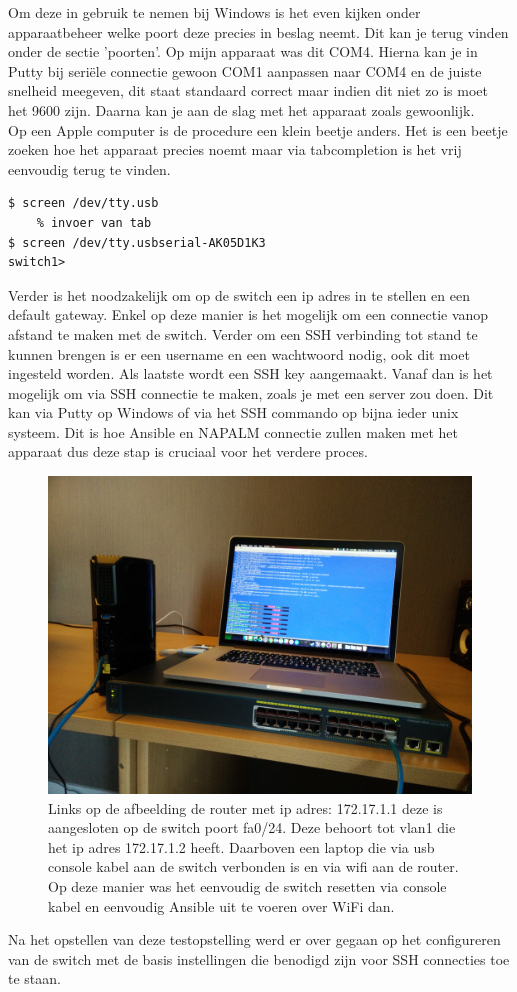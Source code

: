 Om deze in gebruik te nemen bij Windows is het even kijken onder apparaatbeheer welke poort deze precies in beslag neemt. Dit kan je terug vinden onder de sectie 'poorten'. Op mijn apparaat was dit COM4. Hierna kan je in Putty bij seriële connectie gewoon COM1 aanpassen naar COM4 en de juiste snelheid meegeven, dit staat standaard correct maar indien dit niet zo is moet het 9600 zijn. Daarna kan je aan de slag met het apparaat zoals gewoonlijk.
\\

Op een Apple computer is de procedure een klein beetje anders. Het is een beetje zoeken hoe het apparaat precies noemt maar via tabcompletion is het vrij eenvoudig terug te vinden.
\begin{center}
\begin{BVerbatim}
$ screen /dev/tty.usb
	% invoer van tab
$ screen /dev/tty.usbserial-AK05D1K3
switch1>
\end{BVerbatim}
\end{center}

Verder is het noodzakelijk om op de switch een ip adres in te stellen en een default gateway. Enkel op deze manier is het mogelijk om een connectie vanop afstand te maken met de switch. Verder om een SSH verbinding tot stand te kunnen brengen is er een username en een wachtwoord nodig, ook dit moet ingesteld worden. Als laatste wordt een SSH key aangemaakt. Vanaf dan is het mogelijk om via SSH connectie te maken, zoals je met een server zou doen. Dit kan via Putty op Windows of via het SSH commando op bijna ieder unix systeem. Dit is hoe Ansible en NAPALM connectie zullen maken met het apparaat dus deze stap is cruciaal voor het verdere proces.
\begin{figure}[H]
\centering
\includegraphics[width=15cm]{../img/setup}
\caption{Links op de afbeelding de router met ip adres: 172.17.1.1 deze is aangesloten op de switch poort fa0/24. Deze behoort tot vlan1 die het ip adres 172.17.1.2 heeft. Daarboven een laptop die via usb console kabel aan de switch verbonden is en via wifi aan de router. Op deze manier was het eenvoudig de switch resetten via console kabel en eenvoudig Ansible uit te voeren over WiFi dan. }
\end{figure}

Na het opstellen van deze testopstelling werd er over gegaan op het configureren van de switch met de basis instellingen die benodigd zijn voor SSH connecties toe te staan.




